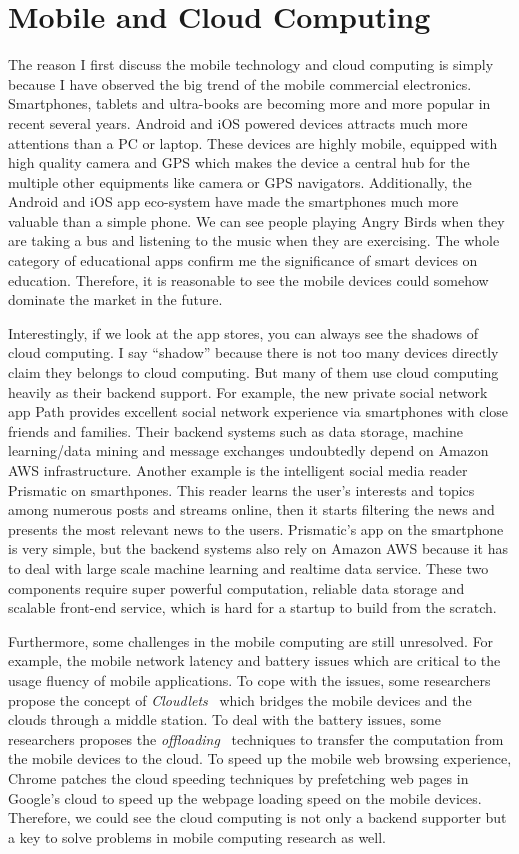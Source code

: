 \section{Mobile and Cloud Computing}
The reason I first discuss the mobile technology and cloud computing is simply because I have observed the big trend of the mobile commercial electronics. Smartphones, tablets and ultra-books are becoming more and more popular in recent several years. Android and iOS powered devices attracts much more attentions than a PC or laptop. These devices are highly mobile, equipped with high quality camera and GPS which makes the device a central hub for the multiple other equipments like camera or GPS navigators. Additionally, the Android and iOS app eco-system have made the smartphones much more valuable than a simple phone. We can see people playing Angry Birds when they are taking a bus and listening to the music when they are exercising. The whole category of educational apps confirm me the significance of smart devices on education. Therefore, it is reasonable to see the mobile devices could somehow dominate the market in the future.

Interestingly, if we look at the app stores, you can always see the shadows of cloud computing. I say ``shadow'' because there is not too many devices directly claim they belongs to cloud computing. But many of them use cloud computing heavily as their backend support. For example, the new private social network app Path\cite{path} provides excellent social network experience via smartphones with close friends and families. Their backend systems such as data storage, machine learning/data mining and message exchanges undoubtedly depend on Amazon AWS infrastructure. Another example is the intelligent social media reader Prismatic\cite{prismatic} on smarthpones. This reader learns the user's interests and topics among numerous posts and streams online, then it starts filtering the news and presents the most relevant news to the users. Prismatic's app on the smartphone is very simple, but the backend systems also rely on Amazon AWS because it has to deal with large scale machine learning and realtime data service. These two components require super powerful computation, reliable data storage and scalable front-end service, which is hard for a startup to build from the scratch. 

Furthermore, some challenges in the mobile computing are still unresolved. For example, the mobile network latency and battery issues which are critical to the usage fluency of mobile applications. To cope with the issues, some researchers propose the concept of \emph{Cloudlets}~\cite{satyanarayanan2009case} which bridges the mobile devices and the clouds through a middle station. To deal with the battery issues, some researchers proposes the \emph{offloading}~\cite{kumar2010cloud} techniques to transfer the computation from the mobile devices to the cloud. To speed up the mobile web browsing experience, Chrome patches the cloud speeding techniques by prefetching web pages in Google's cloud to speed up the webpage loading speed on the mobile devices. Therefore, we could see the cloud computing is not only a backend supporter but a key to solve problems in mobile computing research as well.


